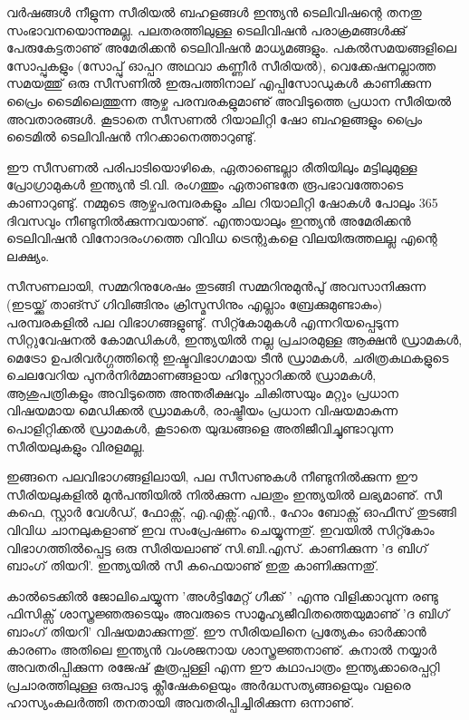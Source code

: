 ﻿
\vskip 2pt

വര്‍ഷങ്ങള്‍ നീളുന്ന സീരിയല്‍ ബഹളങ്ങള്‍ ഇന്ത്യന്‍ ടെലിവിഷന്റെ തനതു സംഭാവനയൊന്നുമല്ല. പലതരത്തിലുള്ള ടെലിവിഷന്‍ 
പരാക്രമങ്ങള്‍ക്കു് പേരുകേട്ടതാണു് അമേരിക്കന്‍ ടെലിവിഷന്‍ മാധ്യമങ്ങളും. പകല്‍സമയങ്ങളിലെ സോപ്പുകളും 
(സോപ്പു് ഓപ്പറ അഥവാ കണ്ണീര്‍ സീരിയല്‍), വെക്കേഷനല്ലാത്ത സമയത്തു് ഒരു സീസണില്‍ 
ഇരുപത്തിനാല് എപ്പിസോഡുകള്‍ കാണിക്കുന്ന പ്രൈം ടൈമിലെത്തുന്ന ആഴ്ച പരമ്പരകളുമാണു് അവിടുത്തെ പ്രധാന സീരിയല്‍ അവതാരങ്ങള്‍. 
കൂടാതെ സീസണല്‍ റിയാലിറ്റി ഷോ ബഹളങ്ങളും പ്രൈം ടൈമില്‍ ടെലിവിഷന്‍ നിറക്കാനെത്താറുണ്ടു്.

ഈ സീസണല്‍ പരിപാടിയൊഴികെ, ഏതാണ്ടെല്ലാ രീതിയിലും മട്ടിലുമുള്ള പ്രോഗ്രാമുകള്‍ ഇന്ത്യന്‍ ടി.വി. രംഗത്തും ഏതാണ്ടതേ
 രൂപഭാവത്തോടെ കാണാറുണ്ടു്. നമ്മുടെ ആഴ്ചപരമ്പരകളും ചില റിയാലിറ്റി ഷോകള്‍ പോലും 365 ദിവസവും നീണ്ടുനില്‍ക്കുന്നവയാണു്.
  എന്തായാലും ഇന്ത്യന്‍ അമേരിക്കന്‍ ടെലിവിഷന്‍ വിനോദരംഗത്തെ വിവിധ ട്രെന്റുകളെ വിലയിരുത്തലല്ല എന്റെ ലക്ഷ്യം.

സീസണലായി, സമ്മറിനുശേഷം തുടങ്ങി സമ്മറിനുമുന്‍പു് അവസാനിക്കുന്ന (ഇടയ്ക്കു് താങ്സ് ഗിവിങ്ങിനും ക്രിസ്മസിനും എല്ലാം 
ബ്രേക്കുമുണ്ടാകും) പരമ്പരകളില്‍ പല വിഭാഗങ്ങളുണ്ടു്. സിറ്റ്കോമുകള്‍ എന്നറിയപ്പെടുന്ന സിറ്റുവേഷനല്‍ കോമഡികള്‍, ഇന്ത്യയില്‍ 
നല്ല പ്രചാരമുള്ള ആക്ഷന്‍ ഡ്രാമകള്‍, മെട്രോ ഉപരിവര്‍ഗ്ഗത്തിന്റെ ഇഷ്ടവിഭാഗമായ ടീന്‍ ഡ്രാമകള്‍, ചരിത്രകഥകളുടെ ചെലവേറിയ
 പുനര്‍നിര്‍മ്മാണങ്ങളായ ഹിസ്റ്റോറിക്കല്‍ ഡ്രാമകള്‍, ആശുപത്രികളും അവിടുത്തെ അന്തരീക്ഷവും ചികിത്സയും മറ്റും പ്രധാന 
 വിഷയമായ മെഡിക്കല്‍ ഡ്രാമകള്‍, രാഷ്ട്രീയം പ്രധാന വിഷയമാകുന്ന പൊളിറ്റിക്കല്‍ ഡ്രാമകള്‍, കൂടാതെ യുദ്ധങ്ങളെ 
 അതിജീവിച്ചുണ്ടാവുന്ന സീരിയലുകളും വിരളമല്ല.

ഇങ്ങനെ പലവിഭാഗങ്ങളിലായി, പല സീസണുകള്‍ നീണ്ടുനില്‍ക്കുന്ന ഈ സീരിയലുകളില്‍ മുന്‍പന്തിയില്‍ നില്‍ക്കുന്ന പലതും 
ഇന്ത്യയില്‍ ലഭ്യമാണു്. സീ കഫെ, സ്റ്റാര്‍ വേള്‍ഡ്, ഫോക്സ്, എ.എക്സ്.എന്‍., ഹോം ബോക്സ് ഓഫീസ് തുടങ്ങി വിവിധ ചാനലുകളാണു് 
ഇവ സംപ്രേഷണം ചെയ്യുന്നതു്. ഇവയില്‍ സിറ്റ്കോം വിഭാഗത്തില്‍പ്പെട്ട ഒരു സീരിയലാണു് സി.ബി.എസ്. കാണിക്കുന്ന 
'ദ ബിഗ് ബാംഗ് തിയറി'. ഇന്ത്യയില്‍ സീ കഫെയാണു് ഇതു കാണിക്കുന്നതു്.

കാല്‍ടെക്കില്‍ ജോലിചെയ്യുന്ന 'അള്‍ട്ടിമേറ്റ് ഗീക്ക് ' എന്നു വിളിക്കാവുന്ന രണ്ടു ഫിസിക്സ് ശാസ്ത്രജ്ഞരുടെയും അവരുടെ
 സാമൂഹ്യജീവിതത്തെയുമാണു് 'ദ ബിഗ് ബാംഗ് തിയറി' വിഷയമാക്കുന്നതു്. ഈ സീരിയലിനെ പ്രത്യേകം ഓര്‍ക്കാന്‍ കാരണം 
 അതിലെ ഇന്ത്യന്‍ വംശജനായ ശാസ്ത്രജ്ഞനാണു്. കുനാല്‍ നയ്യാര്‍ അവതരിപ്പിക്കുന്ന രജേഷ് കൂത്രപ്പള്ളി എന്ന ഈ കഥാപാത്രം 
 ഇന്ത്യക്കാരെപ്പറ്റി പ്രചാരത്തിലുള്ള ഒരുപാടു ക്ലീഷേകളെയും അര്‍ദ്ധസത്യങ്ങളെയും വളരെ ഹാസ്യംകലര്‍ത്തി തനതായി
  അവതരിപ്പിച്ചിരിക്കുന്ന ഒന്നാണു്.

